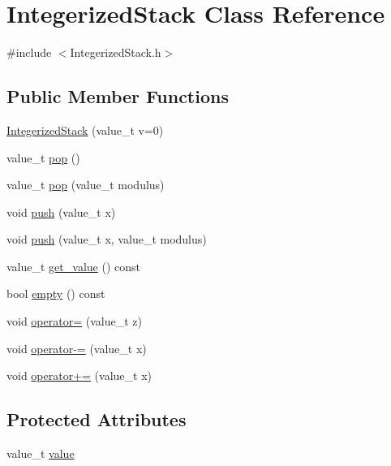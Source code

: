 \hypertarget{class_integerized_stack}{}\section{Integerized\+Stack Class Reference}
\label{class_integerized_stack}


{\ttfamily \#include $<$Integerized\+Stack.\+h$>$}

\subsection*{Public Member Functions}
\begin{DoxyCompactItemize}
\item 
\hyperlink{class_integerized_stack_a46b24ace7ea983bfabaa437932111440}{Integerized\+Stack} (value\+\_\+t v=0)
\item 
value\+\_\+t \hyperlink{class_integerized_stack_a5edd593c74341341cc6f8e41e0f14bdf}{pop} ()
\item 
value\+\_\+t \hyperlink{class_integerized_stack_a713da8c8102cb5a53ec3ad87fada36f5}{pop} (value\+\_\+t modulus)
\item 
void \hyperlink{class_integerized_stack_a721481e52e56398bee39edf6a3d2ff80}{push} (value\+\_\+t x)
\item 
void \hyperlink{class_integerized_stack_affd28eb928362de80e35cd4e1ecdf96b}{push} (value\+\_\+t x, value\+\_\+t modulus)
\item 
value\+\_\+t \hyperlink{class_integerized_stack_aedecc57b1bbb2c056f57a00ec6eea2e3}{get\+\_\+value} () const
\item 
bool \hyperlink{class_integerized_stack_a549d4ed66e89d2e3d7e726d5c8e28fa2}{empty} () const
\item 
void \hyperlink{class_integerized_stack_a829e18dc8bae3eb371e9822271102a2d}{operator=} (value\+\_\+t z)
\item 
void \hyperlink{class_integerized_stack_ac2ec311399b327573a2c0f19d2a902a4}{operator-\/=} (value\+\_\+t x)
\item 
void \hyperlink{class_integerized_stack_a70df05b936e94c717584290d0c457cca}{operator+=} (value\+\_\+t x)
\end{DoxyCompactItemize}
\subsection*{Protected Attributes}
\begin{DoxyCompactItemize}
\item 
value\+\_\+t \hyperlink{class_integerized_stack_afcfb2d32d51c88b556f3bb7ff2544be5}{value}
\end{DoxyCompactItemize}


